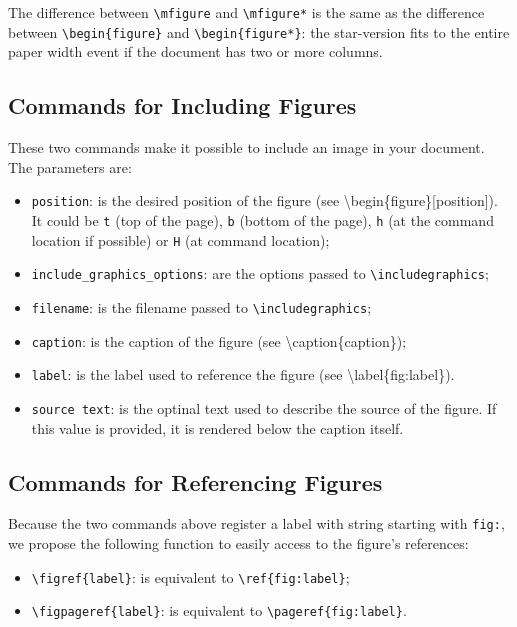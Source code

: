 \documentclass[book,taskpackage,specpackage,codepackage]{upmethodology-document}
\begin{document}
The difference between \texttt{{\textbackslash}mfigure} and \texttt{{\textbackslash}mfigure*} is the same as the difference between \texttt{{\textbackslash}begin\{figure\}} and \texttt{{\textbackslash}begin\{figure*\}}: the star-version fits to the entire paper width event if the document has two or more columns.

\subsection{Commands for Including Figures}

These two commands make it possible to include an image in your document. The parameters are:
\begin{itemize}
\item \texttt{position}: is the desired position of the figure (see {\textbackslash}begin\{figure\}[position]). It could be \texttt{t} (top of the page), \texttt{b} (bottom of the page), \texttt{h} (at the command location if possible) or \texttt{H} (at command location);

\item \texttt{include\_graphics\_options}: are the options passed to \texttt{{\textbackslash}includegraphics};

\item \texttt{filename}: is the filename passed to \texttt{{\textbackslash}includegraphics};

\item \texttt{caption}: is the caption of the figure (see {\textbackslash}caption\{caption\});

\item \texttt{label}: is the label used to reference the figure (see {\textbackslash}label\{fig:label\}).

\item \texttt{source text}: is the optinal text used to describe the source of the figure. If this value is provided, it is rendered below the caption itself.
\end{itemize}

\subsection{Commands for Referencing Figures}

Because the two commands above register a label with string starting with \texttt{fig:}, we propose the following function to easily access to the figure's references:
\begin{itemize}
\item \texttt{{\textbackslash}figref\{label\}}: is equivalent to \texttt{{\textbackslash}ref\{fig:label\}};
\item \texttt{{\textbackslash}figpageref\{label\}}: is equivalent to \texttt{{\textbackslash}pageref\{fig:label\}}.
\end{itemize}
\end{document}
